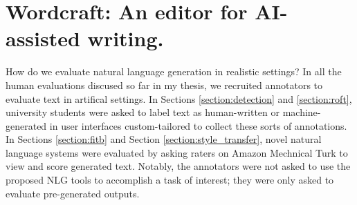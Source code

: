 

\section{Wordcraft: An editor for AI-assisted writing.}
\label{section:wordcraft}

How do we evaluate natural language generation in realistic settings? In all the human evaluations discused so far in my thesis, we recruited annotators to evaluate text in artifical settings. In Sections \ref{section:detection} and \ref{section:roft}, university students were asked to label text as human-written or machine-generated in user interfaces custom-tailored to collect these sorts of annotations. In Sections \ref{section:fitb} and Section \ref{section:style_transfer}, novel natural language systems were evaluated by asking raters on Amazon Mechnical Turk to view and score generated text.
Notably, the annotators were not asked to use the proposed NLG tools to accomplish a task of interest; they were only asked to evaluate pre-generated outputs.

